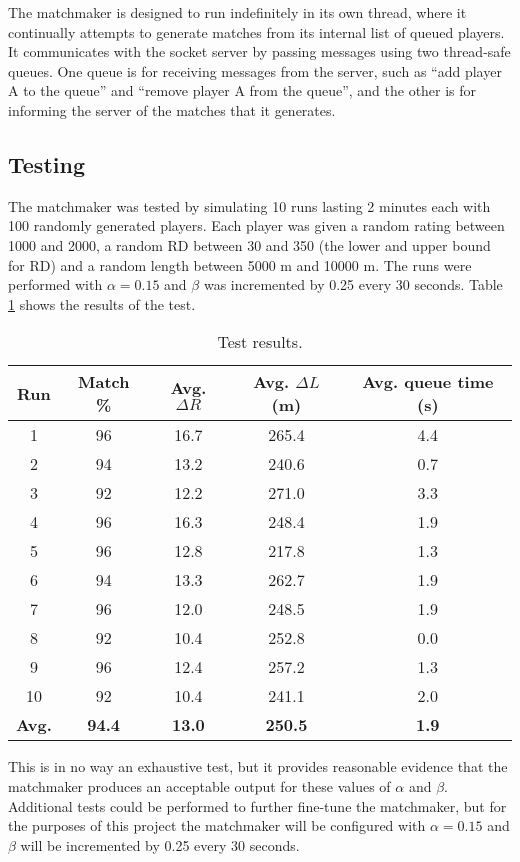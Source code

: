 The matchmaker is designed to run indefinitely in its own thread, where it continually attempts to generate matches from its internal list of queued players.
It communicates with the socket server by passing messages using two thread-safe queues.
One queue is for receiving messages from the server, such as ``add player A to the queue'' and ``remove player A from the queue'', and the other is for informing the server of the matches that it generates.


\subsection{Testing}
The matchmaker was tested by simulating 10 runs lasting 2 minutes each with 100 randomly generated players.
Each player was given a random rating between 1000 and 2000, a random RD between 30 and 350 (the lower and upper bound for RD) and a random length between 5000 m and 10000 m.
The runs were performed with $\alpha = 0.15$ and $\beta$ was incremented by 0.25 every 30 seconds.
Table \ref{tab:test_results} shows the results of the test.

\begin{table}[!ht]
	\centering
	\begin{tabular}{c | c c c c}
		\textbf{Run}	& \textbf{Match \%}		& \textbf{Avg. $\Delta R$}		& \textbf{Avg. $\Delta L$ (m)}		& \textbf{Avg. queue time (s)} \\
		\hline
		1				& 96					& 16.7							& 265.4								& 4.4 \\
		2				& 94					& 13.2							& 240.6								& 0.7 \\
		3				& 92					& 12.2							& 271.0								& 3.3 \\
		4				& 96					& 16.3							& 248.4								& 1.9 \\
		5				& 96					& 12.8							& 217.8								& 1.3 \\
		6				& 94					& 13.3							& 262.7								& 1.9 \\
		7				& 96					& 12.0							& 248.5								& 1.9 \\
		8				& 92					& 10.4							& 252.8								& 0.0 \\
		9				& 96					& 12.4							& 257.2								& 1.3 \\
		10				& 92					& 10.4							& 241.1								& 2.0 \\
		\hline\hline
		\textbf{Avg.}	& \textbf{94.4}			& \textbf{13.0}					& \textbf{250.5}					& \textbf{1.9}
	\end{tabular}
	\caption{Test results.}
	\label{tab:test_results}
\end{table}

This is in no way an exhaustive test, but it provides reasonable evidence that the matchmaker produces an acceptable output for these values of $\alpha$ and $\beta$.
Additional tests could be performed to further fine-tune the matchmaker, but for the purposes of this project the matchmaker will be configured with $\alpha = 0.15$ and $\beta$ will be incremented by 0.25 every 30 seconds.
